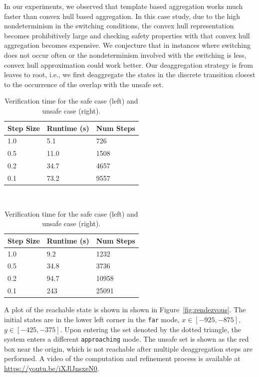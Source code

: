 In our experiments, we observed that template based aggregation works much faster than convex hull based aggregation. In this case study, due to the high nondeterminism in the switching conditions, the convex hull representation becomes prohibitively large and checking safety properties with that convex hull aggregation becomes expensive. We conjecture that in instances where switching does not occur often or the nondeterminism involved with the switching is less, convex hull approximation could work better.
Our deaggregation strategy is from leaves to root, i.e., we first deaggregate the states in the discrete transition closest to the occurrence of the overlap with the unsafe set.


\setlength{\tabcolsep}{2pt}
\begin{table}[t]
\caption{Verification time for the safe case (left) and unsafe case (right).}
\label{tab:runtime}
\centering
\setlength{\aboverulesep}{0.0pt}
\setlength{\belowrulesep}{0.0pt}
\setlength{\extrarowheight}{.0ex}
\begin{tabular}{@{}lll@{}}
  \toprule
  Step Size & Runtime (s) & Num Steps \\
  \midrule
  1.0 & 5.1 & 726 \\
  0.5 & 11.0 & 1508 \\
  0.2 & 34.7 & 4657 \\
  0.1 & 73.2 & 9557 \\
\bottomrule
\end{tabular}
~~~~~~~~
\begin{tabular}{@{}lll@{}}
  \toprule
  Step Size & Runtime (s) & Num Steps \\
  \midrule
  1.0 & 9.2 & 1232 \\
  0.5 & 34.8 & 3736 \\
  0.2 & 94.7 & 10958 \\
  0.1 & 243 & 25091 \\
\bottomrule
\end{tabular}
\end{table}

A plot of the reachable state is shown in shown in Figure~\ref{fig:rendezvous}.
%
The initial states are in the lower left corner in the \texttt{far} mode,
$x \in [-925, -875]$, $y \in [-425, -375]$.
%
Upon entering the set denoted by the dotted triangle,
the system enters a different \texttt{approaching} mode.
%
The unsafe set is shown as the red box near the origin, which is not reachable after multiple deaggregation steps are performed.
%
A video of the computation and refinement process is available at \url{https://youtu.be/iXJlJnsxeN0}.

